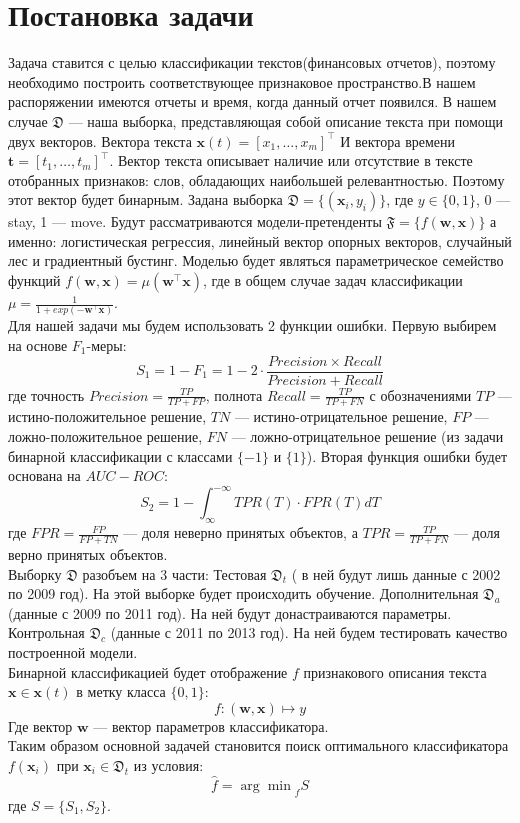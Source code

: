 \documentclass[12pt, twoside]{article}
\begin{document}
\section{Постановка задачи}

Задача ставится с целью классификации текстов(финансовых отчетов), поэтому необходимо построить соответствующее признаковое пространство.В нашем распоряжении имеются отчеты и время, когда данный отчет появился. В нашем случае $\mathfrak{D}$ --- наша выборка, представляющая собой описание текста при помощи двух векторов. Вектора текста $\mathbf{x}(t) = [x_1, \dots, x_m]^\top$ И вектора времени $\mathbf{t} = [t_1, \dots, t_m]^\top$. Вектор текста  описывает наличие или отсутствие в тексте  отобранных признаков: слов, обладающих наибольшей релевантностью. Поэтому этот вектор будет бинарным. Задана выборка $\mathfrak{D} = \{(\mathbf{x}_i, y_i)\}$, где $y \in \{0, 1\}$, 0 --- stay, 1 --- move. Будут рассматриваются модели-претенденты $\mathfrak{F} = \{f(\mathbf{w, x})\}$ а именно: логистическая регрессия, линейный вектор опорных векторов, случайный лес и градиентный бустинг. Моделью будет являться параметрическое семейство функций $f(\mathbf{w, x}) = \mu (\mathbf{w}^\top \mathbf{x})$, где в общем случае задач классификации $\mu = \frac{1}{1 + exp(-\mathbf{w}^\top \mathbf{x})}$. \\
Для нашей задачи мы будем использовать 2 функции ошибки. Первую выбирем на основе $F_1$-меры: $$S_1 = 1 - F_1 = 1 - 2 \cdot \frac{Precision \times Recall}{Precision + Recall}$$ где точность $Precision = \frac{TP}{TP + FP}$, полнота $Recall = \frac{TP}{TP + FN}$ с обозначениями $TP$ --- истино-положительное решение, $TN$ --- истино-отрицательное решение, $FP$ --- ложно-положительное решение, $FN$ --- ложно-отрицательное решение (из задачи бинарной классификации с классами $\{-1\}$ и $\{1\}$). 
Вторая функция ошибки будет основана на $AUC-ROC$: $$S_2 = 1 - \int_\infty^{-\infty} {TPR(T) \cdot FPR(T) dT}$$ где $FPR = \frac{FP}{FP + TN}$ --- доля неверно принятых объектов, а $TPR = \frac{TP}{TP + FN}$ --- доля верно принятых объектов.\\
Выборку $\mathfrak{D}$ разобъем на 3 части: Тестовая $\mathfrak{D}_t$ ( в ней будут лишь данные с 2002 по 2009 год). На этой выборке будет происходить обучение. Дополнительная $\mathfrak{D}_a$ (данные с 2009 по 2011 год). На ней будут донастраиваются параметры. Контрольная  $\mathfrak{D}_c$ (данные с 2011 по 2013 год). На ней будем тестировать качество построенной модели.\\
Бинарной классификацией будет отображение $f$ признакового описания текста $\mathbf{x} \in \mathbf{x}(t)$ в метку класса $\{0, 1\}$: $$f: (\mathbf{w, x}) \mapsto y$$ Где вектор $\mathbf{w}$ --- вектор параметров классификатора.\\
Таким образом основной задачей становится поиск оптимального классификатора $f(\mathbf{x}_i)$ при $\mathbf{x}_i \in \mathfrak{D}_t$ из условия: $$\hat{f} = {\arg\!\min}_{f} S$$
где $S = \{S_1, S_2\}$. 
\end{document}

